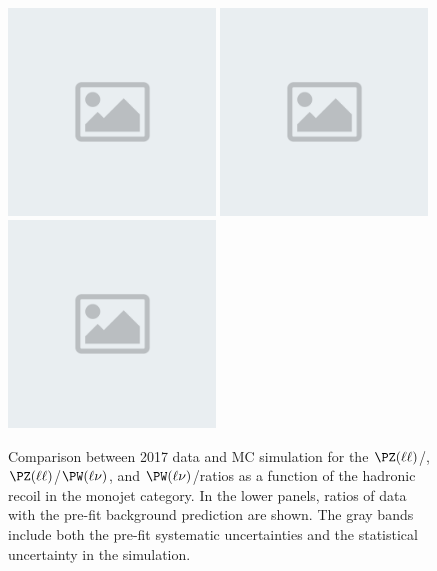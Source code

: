 \begin{figure}[htbp]
\centering
\includegraphics[width=0.49\textwidth]{placeholder.png}
\includegraphics[width=0.49\textwidth]{placeholder.png}
\\
\includegraphics[width=0.49\textwidth]{placeholder.png}
\caption{Comparison between 2017 data and MC simulation for the  $\PZ(\ell\ell)$/\phojets,
$\PZ(\ell\ell)$/$\PW(\ell\nu)$, and $\PW(\ell\nu)$/\phojets ratios as a function
of the hadronic recoil in the monojet category.
In the lower panels, ratios of data with the pre-fit background prediction are shown.
The gray bands include both the pre-fit systematic uncertainties and the statistical uncertainty in the simulation.}
\label{fig:Ratio_2017}
\end{figure}

